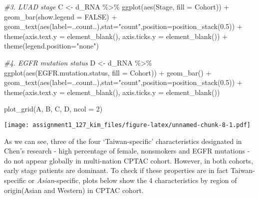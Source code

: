 \documentclass[
]{article}
\newenvironment{Shaded}{\begin{snugshade}}{\end{snugshade}}
\newcommand{\AttributeTok}[1]{\textcolor[rgb]{0.77,0.63,0.00}{#1}}
\newcommand{\CommentTok}[1]{\textcolor[rgb]{0.56,0.35,0.01}{\textit{#1}}}
\newcommand{\ConstantTok}[1]{\textcolor[rgb]{0.00,0.00,0.00}{#1}}
\newcommand{\DecValTok}[1]{\textcolor[rgb]{0.00,0.00,0.81}{#1}}
\newcommand{\FloatTok}[1]{\textcolor[rgb]{0.00,0.00,0.81}{#1}}
\newcommand{\FunctionTok}[1]{\textcolor[rgb]{0.00,0.00,0.00}{#1}}
\newcommand{\NormalTok}[1]{#1}
\newcommand{\OtherTok}[1]{\textcolor[rgb]{0.56,0.35,0.01}{#1}}
\newcommand{\SpecialCharTok}[1]{\textcolor[rgb]{0.00,0.00,0.00}{#1}}
\newcommand{\StringTok}[1]{\textcolor[rgb]{0.31,0.60,0.02}{#1}}
\begin{document}
\begin{Shaded}
\begin{Highlighting}[]
\CommentTok{\#3. LUAD stage}
\NormalTok{C }\OtherTok{\textless{}{-}}\NormalTok{ d\_RNA }\SpecialCharTok{\%\textgreater{}\%}
  \FunctionTok{ggplot}\NormalTok{(}\FunctionTok{aes}\NormalTok{(Stage, }\AttributeTok{fill =}\NormalTok{ Cohort)) }\SpecialCharTok{+} 
  \FunctionTok{geom\_bar}\NormalTok{(}\AttributeTok{show.legend =} \ConstantTok{FALSE}\NormalTok{) }\SpecialCharTok{+}
  \FunctionTok{geom\_text}\NormalTok{(}\FunctionTok{aes}\NormalTok{(}\AttributeTok{label=}\NormalTok{..count..),}\AttributeTok{stat=}\StringTok{"count"}\NormalTok{,}\AttributeTok{position=}\FunctionTok{position\_stack}\NormalTok{(}\FloatTok{0.5}\NormalTok{)) }\SpecialCharTok{+}
  \FunctionTok{theme}\NormalTok{(}\AttributeTok{axis.text.y =} \FunctionTok{element\_blank}\NormalTok{(),}
        \AttributeTok{axis.ticks.y =} \FunctionTok{element\_blank}\NormalTok{()) }\SpecialCharTok{+} 
  \FunctionTok{theme}\NormalTok{(}\AttributeTok{legend.position=}\StringTok{"none"}\NormalTok{)}

\CommentTok{\#4. EGFR mutation status}
\NormalTok{D }\OtherTok{\textless{}{-}}\NormalTok{ d\_RNA }\SpecialCharTok{\%\textgreater{}\%}
  \FunctionTok{ggplot}\NormalTok{(}\FunctionTok{aes}\NormalTok{(EGFR.mutation.status, }\AttributeTok{fill =}\NormalTok{ Cohort)) }\SpecialCharTok{+} 
  \FunctionTok{geom\_bar}\NormalTok{() }\SpecialCharTok{+}
  \FunctionTok{geom\_text}\NormalTok{(}\FunctionTok{aes}\NormalTok{(}\AttributeTok{label=}\NormalTok{..count..),}\AttributeTok{stat=}\StringTok{"count"}\NormalTok{,}\AttributeTok{position=}\FunctionTok{position\_stack}\NormalTok{(}\FloatTok{0.5}\NormalTok{)) }\SpecialCharTok{+}
  \FunctionTok{theme}\NormalTok{(}\AttributeTok{axis.text.y =} \FunctionTok{element\_blank}\NormalTok{(),}
        \AttributeTok{axis.ticks.y =} \FunctionTok{element\_blank}\NormalTok{())}

\FunctionTok{plot\_grid}\NormalTok{(A, B, C, D, }
          \AttributeTok{ncol =} \DecValTok{2}\NormalTok{)}
\end{Highlighting}
\end{Shaded}

\texttt{[image: assignment1\_127\_kim\_files/figure-latex/unnamed-chunk-8-1.pdf]}

As we can see, three of the four `Taiwan-specific' characteristics
designated in Chen's research - high percentage of female, nonsmokers
and EGFR mutations - do not appear globally in multi-nation CPTAC
cohort. However, in both cohorts, early stage patients are dominant. To
check if these properties are in fact Taiwan-specific or
\emph{Asian}-specific, plots below show the 4 characteristics by region
of origin(Asian and Western) in CPTAC cohort.
\end{document}
